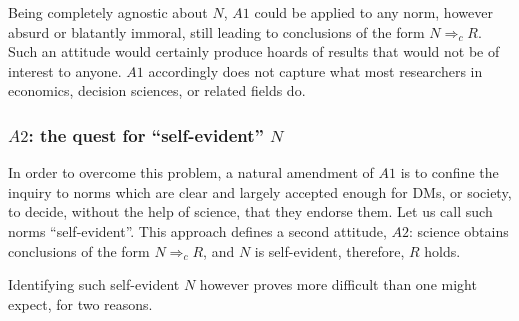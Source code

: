 \documentclass[preprint, french, english, 11pt, authoryear]{elsarticle}%
\newcommand{\protectforpdf}[1]{\texorpdfstring{\ensuremath{#1}}{#1}}
\begin{document}
Being completely agnostic about $N$, $A1$ could be applied to any norm, however absurd or blatantly immoral, still leading to conclusions of the form $N ⇒_c R$. Such an attitude would certainly produce hoards of results that would not be of interest to anyone. $A1$ accordingly does not capture what most researchers in economics, decision sciences, or related fields do.

\subsubsection{\protectforpdf{A2}: the quest for “self-evident” \protectforpdf{N}}
In order to overcome this problem, a natural amendment of $A1$ is to confine the inquiry to norms which are clear and largely accepted enough for \acp{DM}, or society, to decide, without the help of science, that they endorse them. Let us call such norms “self-evident”.
This approach defines a second attitude, $A2$: science obtains conclusions of the form $N ⇒_c R$, and $N$ is self-evident, therefore, $R$ holds.

Identifying such self-evident $N$ however proves more difficult than one might expect, for two reasons.
\end{document}
